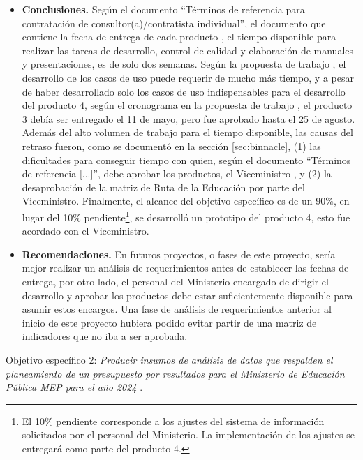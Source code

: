 \documentclass[9pt,a4paper]{IEEEtran}
\begin{document}
\begin{itemize}
	\item \textbf{Conclusiones.} Seg\'un el documento ``T\'erminos de referencia para contrataci\'on de consultor(a)/contratista individual'', el documento que contiene la fecha de entrega de cada producto \cite{trd}, el tiempo disponible para realizar las tareas de desarrollo, control de calidad y elaboraci\'on de manuales y presentaciones, es de solo dos semanas. Seg\'un la propuesta de trabajo \cite{prop}, el desarrollo de los casos de uso puede requerir de mucho m\'as tiempo, y a pesar de haber desarrollado solo los casos de uso indispensables para el desarrollo del producto 4, seg\'un el cronograma en la propuesta de trabajo \cite{prop}, el producto 3 deb\'ia ser entregado el 11 de mayo, pero fue aprobado hasta el 25 de agosto. Adem\'as del alto volumen de trabajo para el tiempo disponible, las causas del retraso fueron, como se document\'o en la secci\'on \ref{sec:binnacle}, (1) las dificultades para conseguir tiempo con quien, seg\'un el documento ``T\'erminos de referencia [...]'', debe aprobar los productos, el Viceministro \cite{trd}, y (2) la desaprobaci\'on de la matriz de Ruta de la Educaci\'on por parte del Viceministro. Finalmente, el alcance del objetivo espec\'ifico es de un 90\%, en lugar del 10\% pendiente\footnote{El 10\% pendiente corresponde a los ajustes del sistema de informaci\'on solicitados por el personal del Ministerio. La implementaci\'on de los ajustes se entregar\'a como parte del producto 4.}, se desarroll\'o un prototipo del producto 4, esto fue acordado con el Viceministro.
	\item \textbf{Recomendaciones.} En futuros proyectos, o fases de este proyecto, ser\'ia mejor realizar un an\'alisis de requerimientos antes de establecer las fechas de entrega, por otro lado, el personal del Ministerio encargado de dirigir el desarrollo y aprobar los productos debe estar suficientemente disponible para asumir estos encargos. Una fase de an\'alisis de requerimientos anterior al inicio de este proyecto hubiera podido evitar partir de una matriz de indicadores que no iba a ser aprobada.
\end{itemize}

Objetivo espec\'ifico 2: \emph{Producir insumos de an\'alisis de datos que respalden el planeamiento de un presupuesto por resultados para el Ministerio de Educaci\'on P\'ublica MEP para el a\~no 2024} \cite{trd}.

\end{document}
